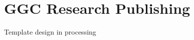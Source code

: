 \documentclass[12pt,letterpaper]{article}
\begin{document}
\section*{GGC Research Publishing}
Template design in processing
\end{document}
